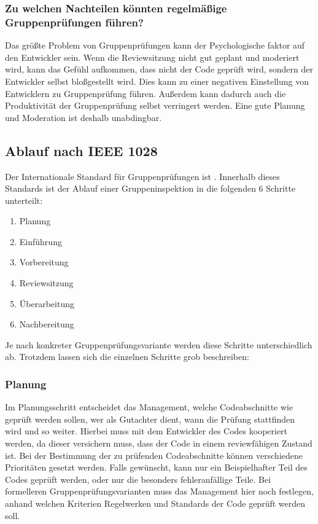 \documentclass[	%
		fontsize=11pt,  %
		a4paper,	    %
		ngerman,		%
		sans,			%
		f4,				%
	]{HsH-report}		%
\begin{document}
\subsubsection{Zu welchen Nachteilen könnten regelmäßige Gruppenprüfungen führen?}

Das größte Problem von Gruppenprüfungen kann der Psychologische faktor auf den
Entwickler sein. Wenn die Reviewsitzung nicht gut geplant und moderiert wird,
kann das Gefühl aufkommen, dass nicht der Code geprüft wird, sondern der
Entwickler selbst bloßgestellt wird. Dies kann zu einer negativen Einstellung
von Entwicklern zu Gruppenprüfung führen. Außerdem kann dadurch auch die
Produktivität der Gruppenprüfung selbst verringert werden. Eine gute Planung
und Moderation ist deshalb unabdingbar.

\subsection{Ablauf nach IEEE 1028}

Der Internationale Standard für Gruppenprüfungen ist \textcite{ieee:1028}.
Innerhalb dieses Standards ist der Ablauf einer Gruppeninspektion in die
folgenden 6 Schritte unterteilt:
\begin{enumerate}
	\item Planung
	\item Einführung
	\item Vorbereitung
	\item Reviewsitzung
	\item Überarbeitung
	\item Nachbereitung
\end{enumerate}

Je nach konkreter Gruppenprüfungsvariante werden diese Schritte unterschiedlich
ab. Trotzdem lassen sich die einzelnen Schritte grob beschreiben:

\subsubsection{Planung} \label{planung}

Im Planungsschritt entscheidet das Management, welche Codeabschnitte wie
geprüft werden sollen, wer als Gutachter dient, wann die Prüfung stattfinden
wird und so weiter. Hierbei muss mit dem Entwickler des Codes kooperiert
werden, da dieser versichern muss, dass der Code in einem reviewfähigen Zustand
ist. Bei der Bestimmung der zu prüfenden Codeabschnitte können verschiedene
Prioritäten gesetzt werden. Falls gewünscht, kann nur ein Beispielhafter Teil
des Codes geprüft werden, oder nur die besonders fehleranfällige Teile. Bei
formelleren Gruppenprüfungsvarianten muss das Management hier noch festlegen,
anhand welchen Kriterien Regelwerken und Standards der Code geprüft werden
soll.
\end{document}
